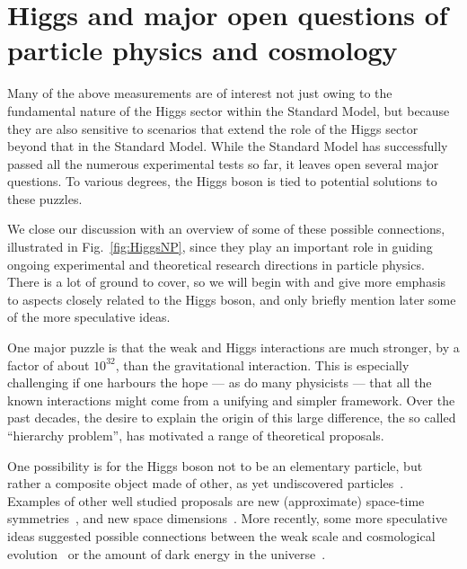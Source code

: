 \documentclass[12pt]{article}
\begin{document}
\section{Higgs and major open questions of particle physics and cosmology}

Many of the above measurements are of interest not just owing to the fundamental nature of the
Higgs sector within the Standard Model, but because they
are also sensitive to scenarios that extend the role of the Higgs
sector beyond that in the Standard Model.
%
While the Standard Model has successfully passed 
all the numerous experimental tests so far, it leaves open
several major questions.
%
%
To various degrees, the Higgs boson is tied to potential solutions
to these puzzles.

We close our discussion with an overview of some of these
possible connections, illustrated in Fig.~\ref{fig:HiggsNP}, 
%
since they play an important role in guiding ongoing experimental and
theoretical research directions in particle physics.
There is a lot of ground to cover, so we will begin with and give more emphasis to aspects closely related to the Higgs boson, and only briefly mention later some of the more speculative ideas.

One major puzzle is that the weak and Higgs interactions are
much stronger, by a factor of about $10^{32}$, than the gravitational
interaction.
%
This is especially challenging if one harbours the hope --- as do many
physicists --- that all the known interactions might come from a
unifying and simpler framework.
%
Over the past 
decades, the desire to explain the origin of
this large difference, the so called ``hierarchy problem'', has
motivated a range of theoretical proposals.

One possibility is for the Higgs boson not to be an elementary particle, but rather a composite object made of other, as yet undiscovered
particles~\cite{Kaplan:1983fs}.
%
Examples of other well studied proposals are
new (approximate) space-time
symmetries~\cite{Fayet:1976et,Fayet:1977yc,Dimopoulos:1981zb}, and new
space
dimensions~\cite{Arkani-Hamed:1998jmv,Antoniadis:1998ig,Randall:1999ee,Randall:1999vf}. More recently, some more speculative ideas suggested possible connections between the weak scale and cosmological
evolution~\cite{Graham:2015cka,Arkani-Hamed:2016rle,Giudice:2021viw} or the amount of
dark energy in the
universe~\cite{Arvanitaki:2016xds,Arkani-Hamed:2020yna}.
\end{document}
